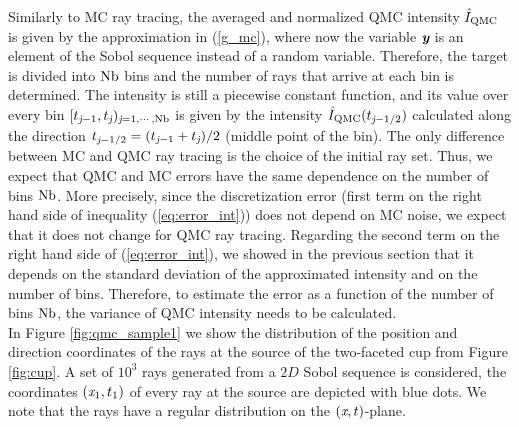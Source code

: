 Similarly to MC ray tracing, the averaged and normalized QMC intensity $\hat{I}_{\textrm{QMC}}$ is given by the approximation in (\ref{g_mc}), where now the variable $\textit{\textbf{y}}$ is an element of the Sobol sequence instead of a random variable. Therefore, the target is divided into $\textrm{Nb}$ bins and the number of rays that arrive at each bin is determined. The intensity is still a piecewise constant function, and its value over every bin $[t_{\textit{j}-1}, t_{\textit{j}})_{\textit{j}=1, \cdots, \textrm{Nb}}$ is given by the intensity $\hat{I}_{\textrm{QMC}}(t_{\textit{j}-1/2})$ calculated along the direction $t_{\textit{j}-1/2} = (t_{\textit{j}-1}+t_{\textit{j}})/2$ (middle point of the bin). The only difference between MC and QMC ray tracing is the choice of the initial ray set. Thus, we expect that QMC and MC errors have the same dependence on the number of bins $\textrm{Nb}$. More precisely, since the discretization error (first term on the right hand side of inequality (\ref{eq:error_int})) does not depend on MC noise, we expect that it does not change for QMC ray tracing. Regarding the second term on the right hand side of (\ref{eq:error_int}), we showed in the previous section that it depends on the standard deviation of the approximated intensity and on the number of bins. Therefore, to estimate the error as a function of the number of bins $\textrm{Nb}$, the variance of QMC intensity needs to be calculated.  
\\ \indent In Figure \ref{fig:qmc_sample1} we show the distribution of the position and direction coordinates of the rays at the source of the two-faceted cup from Figure \ref{fig:cup}. 
A set of $10^3$ rays generated from a $2D$ Sobol sequence is considered, the coordinates $(\textit{x}_1, t_1)$ of every ray at the source are depicted with blue dots.
We note that the rays have a regular distribution on the $(\textit{x}, t)$-plane.
